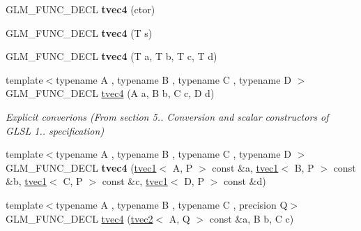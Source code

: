 \begin{DoxyCompactItemize}
\item 
\hypertarget{structglm_1_1tvec4_a3b4d7aa688c7fc353820f1468718844c}{G\-L\-M\-\_\-\-F\-U\-N\-C\-\_\-\-D\-E\-C\-L {\bfseries tvec4} (ctor)}\label{structglm_1_1tvec4_a3b4d7aa688c7fc353820f1468718844c}

\item 
\hypertarget{structglm_1_1tvec4_a9cbd11c29baaf7b4bcd353434bfaee08}{G\-L\-M\-\_\-\-F\-U\-N\-C\-\_\-\-D\-E\-C\-L {\bfseries tvec4} (T s)}\label{structglm_1_1tvec4_a9cbd11c29baaf7b4bcd353434bfaee08}

\item 
\hypertarget{structglm_1_1tvec4_a9b913e0ba895af72d36372b87d836dba}{G\-L\-M\-\_\-\-F\-U\-N\-C\-\_\-\-D\-E\-C\-L {\bfseries tvec4} (T a, T b, T c, T d)}\label{structglm_1_1tvec4_a9b913e0ba895af72d36372b87d836dba}

\item 
\hypertarget{structglm_1_1tvec4_a232c1b6ed2541a0f8f4ab865e9ae537f}{{\footnotesize template$<$typename A , typename B , typename C , typename D $>$ }\\G\-L\-M\-\_\-\-F\-U\-N\-C\-\_\-\-D\-E\-C\-L \hyperlink{structglm_1_1tvec4_a232c1b6ed2541a0f8f4ab865e9ae537f}{tvec4} (A a, B b, C c, D d)}\label{structglm_1_1tvec4_a232c1b6ed2541a0f8f4ab865e9ae537f}

\begin{DoxyCompactList}\small\item\em Explicit converions (From section 5.. Conversion and scalar constructors of G\-L\-S\-L 1.. specification) \end{DoxyCompactList}\item 
\hypertarget{structglm_1_1tvec4_a9c3452f0646e7424ee63f2974cb783db}{{\footnotesize template$<$typename A , typename B , typename C , typename D $>$ }\\G\-L\-M\-\_\-\-F\-U\-N\-C\-\_\-\-D\-E\-C\-L {\bfseries tvec4} (\hyperlink{structglm_1_1tvec1}{tvec1}$<$ A, P $>$ const \&a, \hyperlink{structglm_1_1tvec1}{tvec1}$<$ B, P $>$ const \&b, \hyperlink{structglm_1_1tvec1}{tvec1}$<$ C, P $>$ const \&c, \hyperlink{structglm_1_1tvec1}{tvec1}$<$ D, P $>$ const \&d)}\label{structglm_1_1tvec4_a9c3452f0646e7424ee63f2974cb783db}

\item 
\hypertarget{structglm_1_1tvec4_a386cc88c1d17ad4409030835f23c2f35}{{\footnotesize template$<$typename A , typename B , typename C , precision Q$>$ }\\G\-L\-M\-\_\-\-F\-U\-N\-C\-\_\-\-D\-E\-C\-L \hyperlink{structglm_1_1tvec4_a386cc88c1d17ad4409030835f23c2f35}{tvec4} (\hyperlink{structglm_1_1tvec2}{tvec2}$<$ A, Q $>$ const \&a, B b, C c)}\label{structglm_1_1tvec4_a386cc88c1d17ad4409030835f23c2f35}


\end{DoxyCompactItemize}
